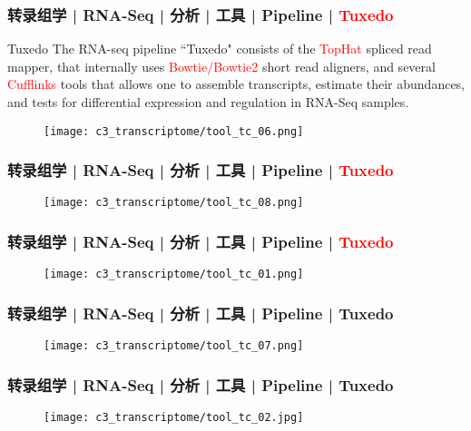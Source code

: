 \begin{frame}
  \frametitle{转录组学 | RNA-Seq | 分析 | 工具 | Pipeline | \textcolor{red}{Tuxedo}}
  {\footnotesize
  \begin{block}{Tuxedo}
    The RNA-seq pipeline ``Tuxedo" consists of the \textcolor{red}{TopHat} spliced read mapper, that internally uses \textcolor{red}{Bowtie/Bowtie2} short read aligners, and several \textcolor{red}{Cufflinks} tools that allows one to assemble transcripts, estimate their abundances, and tests for differential expression and regulation in RNA-Seq samples.
  \end{block}
}
  \begin{figure}
    \centering
    \texttt{[image: c3\_transcriptome/tool\_tc\_06.png]}
  \end{figure}
\end{frame}

\begin{frame}
  \frametitle{转录组学 | RNA-Seq | 分析 | 工具 | Pipeline | \textcolor{red}{Tuxedo}}
  \begin{figure}
    \centering
    \texttt{[image: c3\_transcriptome/tool\_tc\_08.png]}
  \end{figure}
\end{frame}

\begin{frame}
  \frametitle{转录组学 | RNA-Seq | 分析 | 工具 | Pipeline | \textcolor{red}{Tuxedo}}
  \begin{figure}
    \centering
    \texttt{[image: c3\_transcriptome/tool\_tc\_01.png]}
  \end{figure}
\end{frame}

\begin{frame}
  \frametitle{转录组学 | RNA-Seq | 分析 | 工具 | Pipeline | Tuxedo}
  \begin{figure}
    \centering
    \texttt{[image: c3\_transcriptome/tool\_tc\_07.png]}
  \end{figure}
\end{frame}

\begin{frame}
  \frametitle{转录组学 | RNA-Seq | 分析 | 工具 | Pipeline | Tuxedo}
  \begin{figure}
    \centering
    \texttt{[image: c3\_transcriptome/tool\_tc\_02.jpg]}
  \end{figure}
\end{frame}

